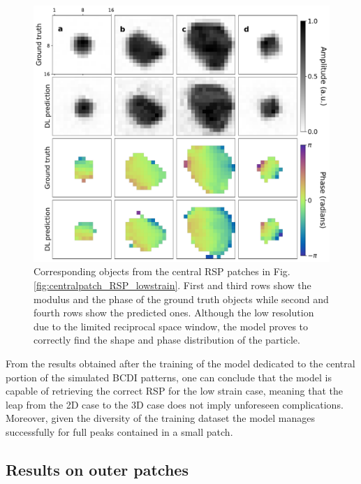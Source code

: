 \begin{figure}[H]
    \centering
    \includegraphics[width=\textwidth]{figures/Phasing/central_patch_lowstrain_obj.pdf}
    \caption{Corresponding objects from the central RSP patches in Fig.\ref{fig:centralpatch_RSP_lowstrain}. First 
    and third rows show the modulus and the phase of the ground truth objects while
    second and fourth rows show the predicted ones. Although the low resolution due to the limited reciprocal space 
    window, the model proves to correctly find the shape and phase distribution of the particle. }

    \label{fig:centralpatch_obj_lowstrain}
\end{figure}

From the results obtained after the training of the model dedicated to the central portion of the simulated BCDI patterns, 
one can conclude that the model is capable of retrieving the correct RSP for the low strain case, meaning that the leap from 
the 2D case to the 3D case does not imply unforeseen complications. Moreover, given the diversity of the training dataset 
the model manages successfully for full peaks contained in a small patch. \\

\subsection{Results on outer patches}

